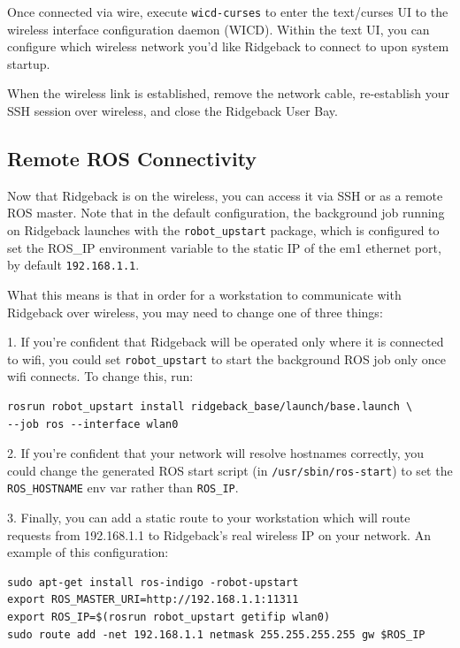 \documentclass[]{clearpath-latex/clearpath-manual}
\begin{document}
Once connected via wire, execute \lstinline{wicd-curses} to enter the text/curses UI to the wireless interface configuration daemon (WICD). Within the text UI, you can configure which wireless network you’d like Ridgeback to connect to upon system startup.

When the wireless link is established, remove the network cable, re-establish your SSH session over wireless,
and close the Ridgeback User Bay.

\subsection{Remote ROS Connectivity}

Now that Ridgeback is on the wireless, you can access it via SSH or as a remote ROS master. Note that in
the default configuration, the background job running on Ridgeback launches with the \lstinline{robot_upstart} package,
which is configured to set the ROS\_IP environment variable to the static IP of the em1 ethernet port, by default
\lstinline{192.168.1.1}.

What this means is that in order for a workstation to communicate with Ridgeback over wireless, you may need to
change one of three things:

1. If you’re confident that Ridgeback will be operated only where it is connected to wifi, you could set
\lstinline{robot_upstart} to start the background ROS job only once wifi connects. To change this, run:

\begin{lstlisting}
rosrun robot_upstart install ridgeback_base/launch/base.launch \
--job ros --interface wlan0
\end{lstlisting}


2. If you’re confident that your network will resolve hostnames correctly, you could change the generated
ROS start script (in \lstinline{/usr/sbin/ros-start}) to set the \lstinline{ROS_HOSTNAME} env var rather than \lstinline{ROS_IP}.

3. Finally, you can add a static route to your workstation which will route requests from 192.168.1.1 to
Ridgeback's real wireless IP on your network. An example of this configuration:

\begin{lstlisting}
sudo apt-get install ros-indigo -robot-upstart
export ROS_MASTER_URI=http://192.168.1.1:11311
export ROS_IP=$(rosrun robot_upstart getifip wlan0)
sudo route add -net 192.168.1.1 netmask 255.255.255.255 gw $ROS_IP
\end{lstlisting}
\end{document}

